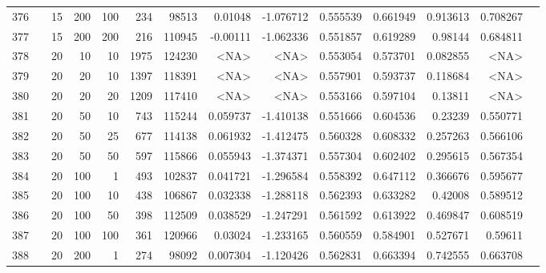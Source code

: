 \begin{longtable}{llrrrrrrrrrrrr}
		376 & &           15 &               200 &          100 &         234 &      98513 &   0.01048 & -1.076712 &  0.555539 &    0.661949 &       0.913613 &  0.708267 \\
		377 & &           15 &               200 &          200 &         216 &     110945 &  -0.00111 & -1.062336 &  0.551857 &    0.619289 &        0.98144 &  0.684811 \\
		378 & &           20 &                10 &           10 &           1975 &     124230 &      <NA> &      <NA> &  0.553054 &    0.573701 &       0.082855 &  <NA> \\
		379 & &           20 &                20 &           10 &           1397 &     118391 &      <NA> &      <NA> &  0.557901 &    0.593737 &       0.118684 &  <NA> \\
		380 & &           20 &                20 &           20 &           1209 &     117410 &      <NA> &      <NA> &  0.553166 &    0.597104 &        0.13811 &  <NA> \\
		381 & &           20 &                50 &           10 &         743 &     115244 &  0.059737 & -1.410138 &  0.551666 &    0.604536 &        0.23239 &  0.550771 \\
		382 & &           20 &                50 &           25 &         677 &     114138 &  0.061932 & -1.412475 &  0.560328 &    0.608332 &       0.257263 &  0.566106 \\
		383 & &           20 &                50 &           50 &         597 &     115866 &  0.055943 & -1.374371 &  0.557304 &    0.602402 &       0.295615 &  0.567354 \\
		384 & &           20 &               100 &            1 &         493 &     102837 &  0.041721 & -1.296584 &  0.558392 &    0.647112 &       0.366676 &  0.595677 \\
		385 & &           20 &               100 &           10 &         438 &     106867 &  0.032338 & -1.288118 &  0.562393 &    0.633282 &        0.42008 &  0.589512 \\
		386 & &           20 &               100 &           50 &         398 &     112509 &  0.038529 & -1.247291 &  0.561592 &    0.613922 &       0.469847 &  0.608519 \\
		387 & &           20 &               100 &          100 &         361 &     120966 &   0.03024 & -1.233165 &  0.560559 &    0.584901 &       0.527671 &   0.59611 \\
		388 & &           20 &               200 &            1 &         274 &      98092 &  0.007304 & -1.120426 &  0.562831 &    0.663394 &       0.742555 &  0.663708 \\

\end{longtable}
